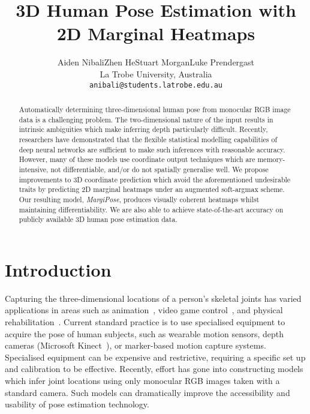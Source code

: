 \documentclass[australian,10pt,twocolumn,letterpaper,twocolumn]{article}
\newcommand{\ourmodel}{MargiPose}
\begin{document}
\title{3D Human Pose Estimation with 2D Marginal Heatmaps}
\author{Aiden Nibali\hspace{1cm}Zhen He\hspace{1cm}Stuart Morgan\hspace{1cm}Luke
Prendergast\\
La Trobe University, Australia\\
\texttt{\small{}anibali@students.latrobe.edu.au}}

\maketitle
\ifwacvfinal\thispagestyle{empty}\fi
\begin{abstract}
Automatically determining three-dimensional human pose from monocular
RGB image data is a challenging problem. The two-dimensional nature
of the input results in intrinsic ambiguities which make inferring
depth particularly difficult. Recently, researchers have demonstrated
that the flexible statistical modelling capabilities of deep neural
networks are sufficient to make such inferences with reasonable accuracy.
However, many of these models use coordinate output techniques which
are memory-intensive, not differentiable, and/or do not spatially
generalise well. We propose improvements to 3D coordinate prediction
which avoid the aforementioned undesirable traits by predicting 2D
marginal heatmaps under an augmented soft-argmax scheme. Our resulting
model,\emph{ \ourmodel{}}, produces visually coherent heatmaps whilst
maintaining differentiability. We are also able to achieve state-of-the-art
accuracy on publicly available 3D human pose estimation data.
\end{abstract}

\section{Introduction}

Capturing the three-dimensional locations of a person's skeletal joints
has varied applications in areas such as animation~\citep{pullen2002motion},
video game control~\citep{rhodin2014interactive}, and physical rehabilitation~\citep{chang2011physrehab}.
Current standard practice is to use specialised equipment to acquire
the pose of human subjects, such as wearable motion sensors, depth
cameras (\eg Microsoft Kinect~\citep{shotton2011kinect}), or marker-based
motion capture systems. Specialised equipment can be expensive and
restrictive, requiring a specific set up and calibration to be effective.
Recently, effort has gone into constructing models which infer joint
locations using only monocular RGB images taken with a standard camera.
Such models can dramatically improve the accessibility and usability
of pose estimation technology.
\end{document}
